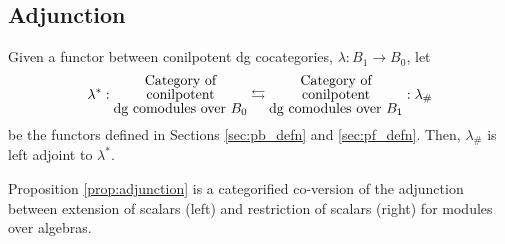 \subsection{Adjunction}
\begin{prop}\label{prop:adjunction}
Given a functor between 
conilpotent dg cocategories, 
$\lambda: B_1 \to B_0$, let
\begin{equation*}
\lambda^*:
\let\scriptstyle\textstyle
\substack{
  \textrm{Category of}\\
  \textrm{conilpotent}\\
  \textrm{dg comodules over }B_0}
\leftrightarrows
\let\scriptstyle\textstyle
\substack{
  \textrm{Category of}\\
  \textrm{conilpotent}\\
  \textrm{dg comodules over }B_1}
: \lambda_\#
\end{equation*}
be the functors defined in Sections 
\ref{sec:pb_defn} and \ref{sec:pf_defn}. Then,
$\lambda_\#$ is left adjoint to $\lambda^*$.
\end{prop}
%
\begin{rem} \label{rem:adjunction}
Proposition \ref{prop:adjunction} 
is a categorified co-version of the 
adjunction between extension of scalars 
(left) and restriction of scalars (right) 
for modules over algebras.
\end{rem}
%
